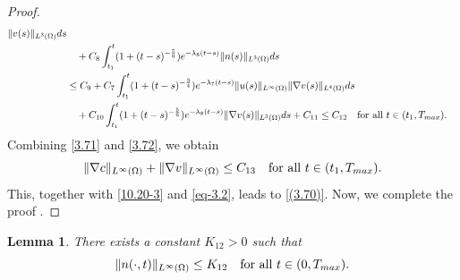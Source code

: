 \documentclass[10pt,a4paper]{amsart}
\numberwithin{equation}{section}
\newtheorem{lemma}[theo]{Lemma}
\begin{document}
\begin{proof}
\begin{equation}
\begin{aligned}
 \| v(s) \|_{L^3(\Omega)} ds \\
&\quad + C_8 \int_{t_1}^t ( 1 + (t - s)^{-\frac{5}{6}} )
e^{-\lambda_8(t - s)} \| n(s) \|_{L^3(\Omega)} ds \\
&\leq C_9 + C_7 \int_{t_1}^t ( 1 + (t - s)^{-\frac{3}{4}} ) e^{-\lambda_7(t - s)}
 \| u(s) \|_{L^\infty(\Omega)} \| \nabla v(s) \|_{L^4(\Omega)} ds  \\
&\quad + C_{10} \int_{t_1}^t ( 1 + (t - s)^{-\frac{5}{6}} ) e^{-\lambda_8(t - s)}
 \| \nabla v(s) \|_{L^3(\Omega)} ds
+ C_{11} \leq C_{12}  \quad \text{for all } t \in (t_1, T_{\rm max}).
\end{aligned}
\end{equation}
Combining \eqref{3.71} and \eqref{3.72}, we obtain
\[
\|\nabla c\|_{L^\infty(\Omega)} + \|\nabla v\|_{L^\infty(\Omega)}
\leq C_{13}   \quad \text{for all } t \in (t_1, T_{\rm max}).
\]
This, together with \eqref{10.20-3} and \eqref{eq-3.2}, leads to \eqref{(3.70)}.
 Now, we complete the proof .
 \end{proof}

\begin{lemma}\label{lem3.11}
There exists a constant $K_{12}>0$ such that
\begin{equation}\label{3.73}
\| n(\cdot, t) \|_{L^\infty(\Omega)} \leq K_{12}
\quad \text{for all } t \in (0, T_{\rm max}).
\end{equation}
\end{lemma}
\end{document}
